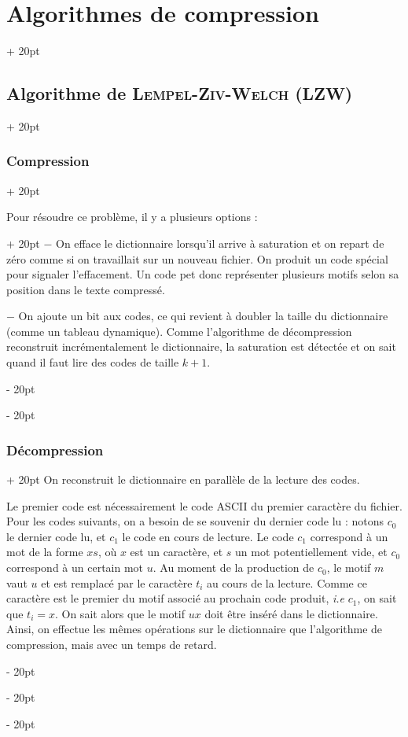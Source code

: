 \documentclass[a4paper, 12pt, twoside]{article}
\newcommand{\ind}[1][20pt]{\advance\leftskip + #1}
\newcommand{\deind}[1][20pt]{\advance\leftskip - #1}
\newenvironment{indt}[2][20pt]{#2 \par \ind[#1]}{\par \deind} %
\begin{document}
\begin{indt}{\section{Algorithmes de compression}}
\begin{indt}{\subsection{Algorithme de \textsc{Lempel-Ziv-Welch} (LZW)}}
\begin{indt}{\subsubsection{Compression}}
                \vspace{6pt}
                
                \begin{indt}{Pour résoudre ce problème, il y a plusieurs options :}
                    $-$ On efface le dictionnaire lorsqu'il arrive à saturation et on repart de zéro comme si on travaillait sur un nouveau fichier. On produit un code spécial pour signaler l'effacement.
                    Un code pet donc représenter plusieurs motifs selon sa position dans le texte compressé.

                    $-$ On ajoute un bit aux codes, ce qui revient à doubler la taille du dictionnaire (comme un tableau dynamique). Comme l'algorithme de décompression reconstruit incrémentalement le dictionnaire, la saturation est détectée et on sait quand il faut lire des codes de taille $k + 1$.
                \end{indt}
            \end{indt}

            \vspace{12pt}
            
            \begin{indt}{\subsubsection{Décompression}}
                On reconstruit le dictionnaire en parallèle de la lecture des codes.

                Le premier code est nécessairement le code ASCII du premier caractère du fichier.
                Pour les codes suivants, on a besoin de se souvenir du dernier code lu : notons $c_0$ le dernier code lu, et $c_1$ le code en cours de lecture. Le code $c_1$ correspond à un mot de la forme $xs$, où $x$ est un caractère, et $s$ un mot potentiellement vide, et $c_0$ correspond à un certain mot $u$.
                Au moment de la production de $c_0$, le motif $m$ vaut $u$ et est remplacé par le caractère $t_i$ au cours de la lecture.
                Comme ce caractère est le premier du motif associé au prochain code produit, \textit{i.e} $c_1$, on sait que $t_i = x$.
                On sait alors que le motif $ux$ doit être inséré dans le dictionnaire.
                Ainsi, on effectue les mêmes opérations sur le dictionnaire que l'algorithme de compression, mais avec un temps de retard.

                \vspace{12pt}
                

\end{indt}
\end{indt}
\end{indt}
\end{document}
